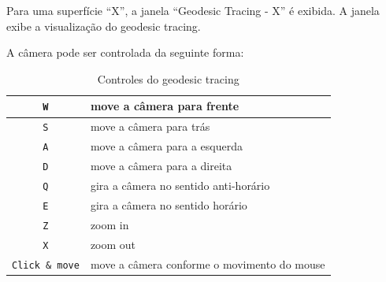 Para uma superfície ``X'', a janela ``Geodesic Tracing - X'' é exibida.
A janela exibe a visualização do geodesic tracing.

A câmera pode ser controlada da seguinte forma:

\begin{table}[ht]
\caption{Controles do geodesic tracing}
\label{gtctrl}
\begin{centering}
\begin{tabularx}{\textwidth}{||c|X||}
    \hline
    \texttt{W} & move a câmera para frente \\ 
    \hline
    \texttt{S} & move a câmera para trás \\
    \hline
    \texttt{A} & move a câmera para a esquerda \\
    \hline
    \texttt{D} & move a câmera para a direita \\
    \hline
    \texttt{Q} & gira a câmera no sentido anti-horário \\
    \hline
    \texttt{E} & gira a câmera no sentido horário \\
    \hline
    \texttt{Z} & zoom in \\
    \hline
    \texttt{X} & zoom out \\
    \hline
    \texttt{Click \& move} & move a câmera conforme o movimento do mouse \\
    \hline
\end{tabularx}
\end{centering}
\end{table}